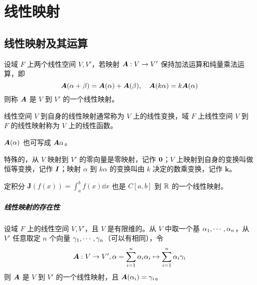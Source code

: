 
\chapter{线性映射}

\section{线性映射及其运算}

\begin{definition}[线性映射]
    设域 $F$ 上两个线性空间 $V,V'$，若映射 $\boldsymbol{A} : V \to V'$ 保持加法运算和纯量乘法运算，即
    \[ \boldsymbol{A}(\alpha + \beta) = \boldsymbol{A}(\alpha) + \boldsymbol{A}(\beta), \quad \boldsymbol{A}(k\alpha) = k \boldsymbol{A}(\alpha) \]
    则称 $\boldsymbol{A}$ 是 $V$ 到 $V'$ 的一个线性映射。
\end{definition}

线性空间 $V$ 到自身的线性映射通常称为 $V$ 上的线性变换，域 $F$ 上线性空间 $V$ 到 $F$ 的线性映射称为 $V$ 上的线性函数。

$\boldsymbol{A}(\alpha)$ 也可写成 $\boldsymbol{A}\alpha$。

特殊的，从 $V$ 映射到 $V'$ 的零向量是零映射，记作 $\boldsymbol{0}$；$V$ 上映射到自身的变换叫做恒等变换，记作 $\boldsymbol{I}$；映射 $\alpha$ 到 $k\alpha$ 的变换叫由 $k$ 决定的数乘变换，记作 $\boldsymbol{k}$。

定积分 $\displaystyle \boldsymbol{J}(f(x)) = \int_a^b f(x) \dd x$ 也是 $C[a,b]$ 到 $\mathbb{R}$ 的一个线性映射。

\paragraph{线性映射的存在性}

\begin{theorem}
    设域 $F$ 上的线性空间 $V,V'$，且 $V$ 是有限维的。从 $V$ 中取一个基 $\alpha_1,\cdots,\alpha_n$，从 $V'$ 任意取定 $n$ 个向量 $\gamma_1,\cdots,\gamma_n$（可以有相同），令
    \[ \boldsymbol{A} : V \to V', \alpha = \sum_{i=1}^n \alpha_i\alpha_i \mapsto \sum_{i=1}^n \alpha_i\gamma_i \]
    则 $\boldsymbol{A}$ 是 $V$ 到 $V'$ 的一个线性映射，且 $\boldsymbol{A}(\alpha_i) = \gamma_i$。
\end{theorem}

